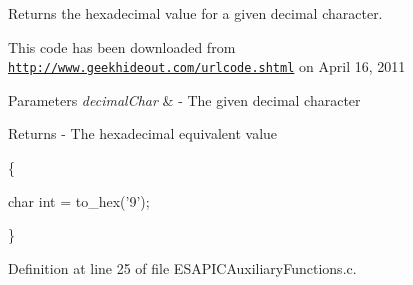 Returns the hexadecimal value for a given decimal character. 

This code has been downloaded from \href{http://www.geekhideout.com/urlcode.shtml}{\tt http://www.geekhideout.com/urlcode.shtml} on April 16, 2011


\begin{DoxyParams}{Parameters}
{\em decimalChar} & -\/ The given decimal character\\
\hline
\end{DoxyParams}
\begin{DoxyReturn}{Returns}
-\/ The hexadecimal equivalent value
\end{DoxyReturn}
\{ 
\begin{DoxyCode}
        char int = to_hex('9');
\end{DoxyCode}
 \} 

Definition at line 25 of file ESAPICAuxiliaryFunctions.c.

